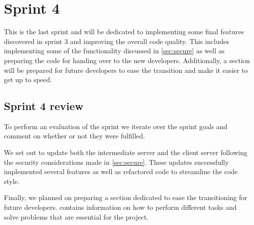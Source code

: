\chapter{Sprint 4}
This is the last sprint and will be dedicated to implementing some final features discovered in sprint 3 and improving the overall code quality. This includes implementing some of the functionality discussed in \cref{sec:secure} as well as preparing the code for handing over to the new developers. Additionally, a section will be prepared for future developers to ease the transition and make it easier to get up to speed.







\section{Sprint 4 review}
To perform an evaluation of the sprint we iterate over the sprint goals and comment on whether or not they were fulfilled.

We set out to update both the intermediate server and the client server following the security considerations made in \cref{sec:secure}. These updates successfully implemented several features as well as refactored code to streamline the code style.

Finally, we planned on preparing a section dedicated to ease the transitioning for future developers.  contains information on how to perform different tasks and solve problems that are essential for the project.